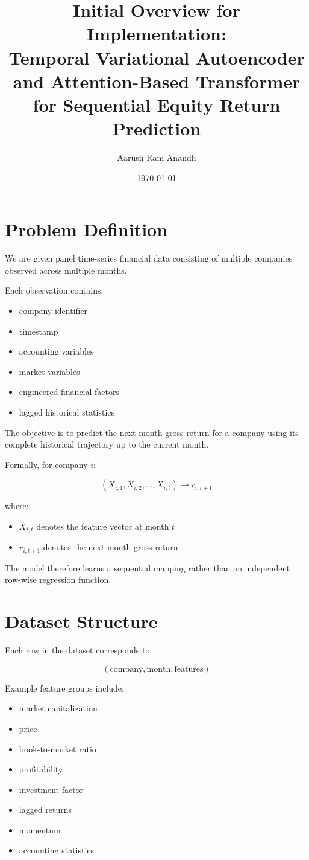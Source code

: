 \documentclass[11pt]{article}
\title{Initial Overview for Implementation:\\
Temporal Variational Autoencoder and Attention-Based Transformer for Sequential Equity Return Prediction}
\author{Aarush Ram Anandh}
\date{\today}
\begin{document}
\maketitle

\tableofcontents

\newpage

\section{Problem Definition}

We are given panel time-series financial data consisting of multiple companies observed across multiple months.

Each observation contains:
\begin{itemize}
    \item company identifier
    \item timestamp
    \item accounting variables
    \item market variables
    \item engineered financial factors
    \item lagged historical statistics
\end{itemize}

The objective is to predict the next-month gross return for a company using its complete historical trajectory up to the current month.

Formally, for company $i$:

\[
(X_{i,1}, X_{i,2}, \dots, X_{i,t})
\rightarrow
r_{i,t+1}
\]

where:
\begin{itemize}
    \item $X_{i,t}$ denotes the feature vector at month $t$
    \item $r_{i,t+1}$ denotes the next-month gross return
\end{itemize}

The model therefore learns a sequential mapping rather than an independent row-wise regression function.

\section{Dataset Structure}

Each row in the dataset corresponds to:

\[
(\text{company}, \text{month}, \text{features})
\]

Example feature groups include:
\begin{itemize}
    \item market capitalization
    \item price
    \item book-to-market ratio
    \item profitability
    \item investment factor
    \item lagged returns
    \item momentum
    \item accounting statistics
\end{itemize}
\end{document}
